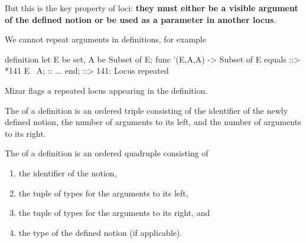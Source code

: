 \begin{node}
\begin{node}
But this is the key property of loci: \textbf{they must either be
  a visible argument of the defined notion or be used as a parameter in another locus}.
\end{node}

\begin{node}\label{mizar-000N}%
We cannot repeat arguments in definitions, for example
\begin{mizar}
definition
  let E be set, A be Subset of E;
  func '(E,A,A) -> Subset of E equals
::>          *141
  E \ A;
  :: ...
end;
::> 141: Locus repeated
\end{mizar}
Mizar flags a repeated locus appearing in the definition.
\end{node}

\begin{definition}
The  of a definition is an ordered triple consisting of
the identifier of the newly defined notion, the number of arguments to
its left, and the number of arguments to its right.
\end{definition}

\begin{definition}
The  of a definition is an ordered quadruple consisting of
\begin{enumerate}
\item the identifier of the notion,
\item the tuple of types for the arguments to its left,
\item the tuple of types for the arguments to its right, and
\item the type of the defined notion (if applicable).
\end{enumerate}
\end{definition}
\end{node}

